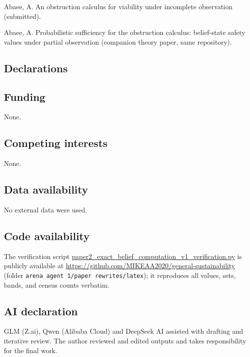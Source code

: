 \documentclass[10pt,twocolumn]{article}
\theoremstyle{plain}
\theoremstyle{definition}
\theoremstyle{remark}
\begin{document}
{\footnotesize
Abaee, A. An obstruction calculus for viability under incomplete
observation (submitted).

Abaee, A. Probabilistic sufficiency for the obstruction calculus:
belief-state safety values under partial observation (companion
theory paper, same repository).
}

\subsection*{Declarations}

\subsection*{Funding}
None.

\subsection*{Competing interests}
None.

\subsection*{Data availability}
No external data were used.

\subsection*{Code availability}
The verification script
\url{paper2_exact_belief_computation_v1_verification.py} is publicly
available at \url{https://github.com/MIKEAA2020/general-sustainability}
(folder \texttt{arena agent 1/paper rewrites/latex}); it reproduces all
values, sets, bands, and census counts verbatim.

\subsection*{AI declaration}
GLM (Z.ai), Qwen (Alibaba Cloud) and DeepSeek AI assisted with drafting
and iterative review. The author reviewed and edited outputs and takes
responsibility for the final work.
\end{document}
